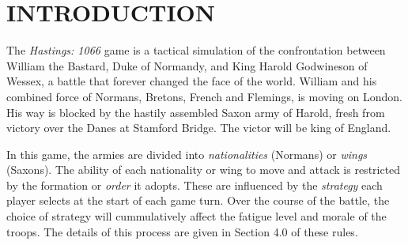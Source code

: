 \section{INTRODUCTION}
\hfill

The \textit{Hastings: 1066} game is a tactical simulation of the confrontation between William the Bastard, Duke of Normandy, and King Harold Godwineson of Wessex, a battle that forever changed the face of the world. William and his combined force of Normans, Bretons, French and Flemings, is moving on London. His way is blocked by the hastily assembled Saxon army of Harold, fresh from victory over the Danes at Stamford Bridge. The victor will be king of England.

In this game, the armies are divided into \textit{nationalities} (Normans) or \textit{wings} (Saxons). The ability of each nationality or wing to move and attack is restricted by the formation or \textit{order} it adopts. These are influenced by the \textit{strategy} each player selects at the start of each game turn. Over the course of the battle, the choice of strategy will cummulatively affect the fatigue level and morale of the troops. The details of this process are given in Section 4.0 of these rules.